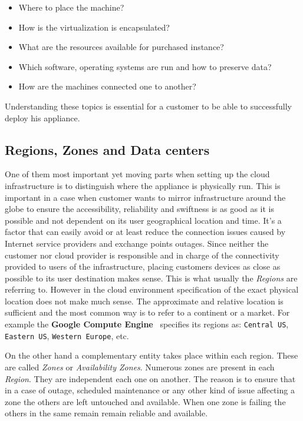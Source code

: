 \begin{itemize}
	\item Where to place the machine?
	\item How is the virtualization is encapsulated?
	\item What are the resources available for purchased instance?
	\item Which software, operating systems are run and how to preserve data?
	\item How are the machines connected one to another?
\end{itemize}

Understanding these topics is essential for a customer to be able to successfully deploy his appliance.

\subsection{Regions, Zones and Data centers}
\label{sub:Regions, Zones and Data centers}

One of them most important yet moving parts when setting up the cloud infrastructure is to distinguish where the appliance is physically run. This is important in a case when customer wants to mirror infrastructure around the globe to ensure the accessibility, reliability and swiftness is as good as it is possible and not dependent on its user geographical location and time. It's a factor that can easily avoid or at least reduce the connection issues caused by Internet service providers and exchange points outages. Since neither the customer nor cloud provider is responsible and in charge of the connectivity provided to users of the infrastructure, placing customers devices as close as possible to its user destination makes sense. This is what usually the \emph{Regions} are referring to. However in the cloud environment specification of the exact physical location does not make much sense. The approximate and relative location is sufficient and the most common way is to refer to a continent or a market. For example the \textbf{Google Compute Engine}~\cite{gce} specifies its regions as: \texttt{Central US}, \texttt{Eastern US}, \texttt{Western Europe}, etc.

On the other hand a complementary entity takes place within each region. These are called \emph{Zones} or \emph{Availability Zones}. Numerous zones are present in each \emph{Region}. They are independent each one on another. The reason is to ensure that in a case of outage, scheduled maintenance or any other kind of issue affecting a zone the others are left untouched and available. When one zone is failing the others in the same remain remain reliable and available.

